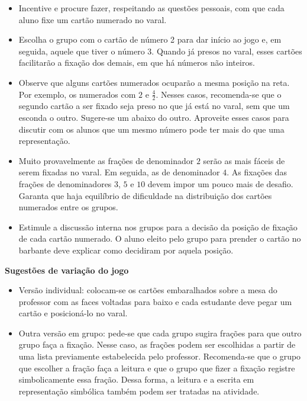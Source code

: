 \documentclass[10 pt,usenames,dvipsnames, oneside]{article}
\begin{document}
\begin{goals}
\begin{itemize}
  \item Incentive e procure fazer, respeitando as questões pessoais, com que cada aluno fixe um cartão numerado no varal. 
  \item Escolha o grupo com o cartão de número 2  para dar início ao jogo e, em seguida, aquele que tiver o número 3.  Quando já presos no varal, esses cartões facilitarão a fixação dos demais, em que há números não inteiros.
  \item Observe que alguns cartões numerados ocuparão a mesma posição na reta. Por exemplo, os numerados com $2$ e $\frac{4}{2}$. Nesses casos, recomenda-se que o segundo cartão a ser fixado seja preso no que já está no varal, sem que um esconda o outro. Sugere-se um abaixo do outro. Aproveite esses casos para discutir com os alunos que um mesmo número pode ter mais do que uma representação.
  \item Muito provavelmente as frações de denominador $2$ serão as mais fáceis de serem fixadas no varal. Em seguida, as de denominador $4$. As fixações das frações de denominadores $3$, $5$ e $10$ devem impor um pouco mais de desafio. Garanta que haja equilíbrio de dificuldade na distribuição dos cartões numerados entre os grupos.
  \item Estimule a discussão interna nos grupos para a decisão da posição de fixação de cada cartão numerado. O aluno eleito pelo grupo para prender o cartão no barbante deve explicar como decidiram por aquela posição.
  \end{itemize}

    \textbf{Sugestões de variação do jogo}\newline

\begin{itemize}  
  \item Versão individual: colocam-se os cartões embaralhados sobre a mesa do professor com as faces voltadas para baixo e cada estudante deve pegar um cartão e posicioná-lo no varal.
  \item Outra versão em grupo: pede-se que cada grupo sugira frações para que outro grupo faça a fixação. Nesse caso, as frações podem ser escolhidas a partir de uma lista previamente estabelecida pelo professor. Recomenda-se que o grupo que escolher a fração faça a leitura e que o grupo que fizer a fixação registre simbolicamente essa fração. Dessa forma, a leitura e a escrita em representação simbólica também podem ser tratadas na atividade.
\end{itemize} %
\end{goals}
\end{document}
